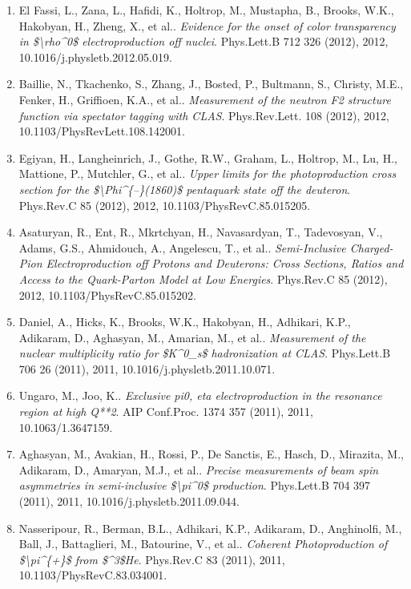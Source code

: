 \begin{enumerate}
\item El Fassi, L., Zana, L., Hafidi, K., Holtrop, M., Mustapha, B., Brooks, W.K., Hakobyan, H., Zheng, X., et al.. \textit{Evidence for the onset of color transparency in \$\textbackslash{}rho\textasciicircum{}0\$  electroproduction off nuclei}. Phys.Lett.B 712 326 (2012), 2012, 10.1016/j.physletb.2012.05.019.
\item Baillie, N., Tkachenko, S., Zhang, J., Bosted, P., Bultmann, S., Christy, M.E., Fenker, H., Griffioen, K.A., et al.. \textit{Measurement of the neutron F2 structure function via spectator tagging with CLAS}. Phys.Rev.Lett. 108 (2012), 2012, 10.1103/PhysRevLett.108.142001.
\item Egiyan, H., Langheinrich, J., Gothe, R.W., Graham, L., Holtrop, M., Lu, H., Mattione, P., Mutchler, G., et al.. \textit{Upper limits for the photoproduction cross section for the \$\textbackslash{}Phi\textasciicircum{}\{--\}(1860)\$ pentaquark state off the deuteron}. Phys.Rev.C 85 (2012), 2012, 10.1103/PhysRevC.85.015205.
\item Asaturyan, R., Ent, R., Mkrtchyan, H., Navasardyan, T., Tadevosyan, V., Adams, G.S., Ahmidouch, A., Angelescu, T., et al.. \textit{Semi-Inclusive Charged-Pion Electroproduction off Protons and Deuterons: Cross Sections, Ratios and Access to the Quark-Parton Model at Low Energies}. Phys.Rev.C 85 (2012), 2012, 10.1103/PhysRevC.85.015202.
\item Daniel, A., Hicks, K., Brooks, W.K., Hakobyan, H., Adhikari, K.P., Adikaram, D., Aghasyan, M., Amarian, M., et al.. \textit{Measurement of the nuclear multiplicity ratio for \$K\textasciicircum{}0\_s\$ hadronization at CLAS}. Phys.Lett.B 706 26 (2011), 2011, 10.1016/j.physletb.2011.10.071.
\item Ungaro, M., Joo, K.. \textit{Exclusive pi0, eta electroproduction in the resonance region at high Q**2}. AIP Conf.Proc. 1374 357 (2011), 2011, 10.1063/1.3647159.
\item Aghasyan, M., Avakian, H., Rossi, P., De Sanctis, E., Hasch, D., Mirazita, M., Adikaram, D., Amaryan, M.J., et al.. \textit{Precise measurements of beam spin asymmetries in semi-inclusive \$\textbackslash{}pi\textasciicircum{}0\$ production}. Phys.Lett.B 704 397 (2011), 2011, 10.1016/j.physletb.2011.09.044.
\item Nasseripour, R., Berman, B.L., Adhikari, K.P., Adikaram, D., Anghinolfi, M., Ball, J., Battaglieri, M., Batourine, V., et al.. \textit{Coherent Photoproduction of \$\textbackslash{}pi\textasciicircum{}\{+\}\$ from \$\textasciicircum{}3\$He}. Phys.Rev.C 83 (2011), 2011, 10.1103/PhysRevC.83.034001.

\end{enumerate}
